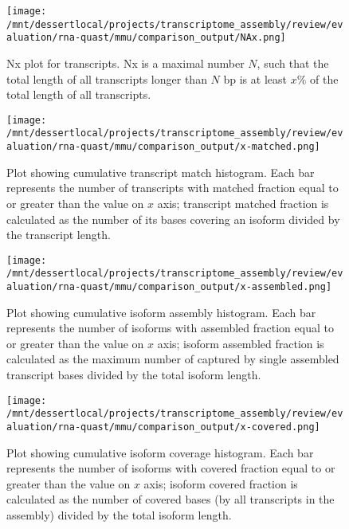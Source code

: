 \documentclass[12pt,a4paper]{article}
\begin{document}
\begin{figure}[t]
\centering
\texttt{[image: /mnt/dessertlocal/projects/transcriptome\_assembly/review/evaluation/rna-quast/mmu/comparison\_output/NAx.png]}
\caption{Nx plot for transcripts. Nx is a maximal number $N$, such that the total length of all transcripts longer than $N$ bp is at least $x\%$ of the total length of all transcripts.}
\end{figure}
\FloatBarrier
\clearpage


\begin{figure}[t]
\centering
\texttt{[image: /mnt/dessertlocal/projects/transcriptome\_assembly/review/evaluation/rna-quast/mmu/comparison\_output/x-matched.png]}
\caption{Plot showing cumulative transcript match histogram. Each bar represents the number of transcripts with matched fraction equal to or greater than the value on $x$ axis; transcript matched fraction is calculated as the number of its bases covering an isoform divided by the transcript length.}
\end{figure}
\FloatBarrier
\clearpage


\begin{figure}[t]
\centering
\texttt{[image: /mnt/dessertlocal/projects/transcriptome\_assembly/review/evaluation/rna-quast/mmu/comparison\_output/x-assembled.png]}
\caption{Plot showing cumulative isoform assembly histogram. Each bar represents the number of isoforms with assembled fraction equal to or greater than the value on $x$ axis; isoform assembled fraction is calculated as the maximum number of captured by single assembled transcript bases divided by the total isoform length.}
\end{figure}
\FloatBarrier
\clearpage


\begin{figure}[t]
\centering
\texttt{[image: /mnt/dessertlocal/projects/transcriptome\_assembly/review/evaluation/rna-quast/mmu/comparison\_output/x-covered.png]}
\caption{Plot showing cumulative isoform coverage histogram. Each bar represents the number of isoforms with covered fraction equal to or greater than the value on $x$ axis; isoform covered fraction is calculated as the number of covered bases (by all transcripts in the assembly) divided by the total isoform length.}
\end{figure}
\FloatBarrier
\clearpage
\end{document}
